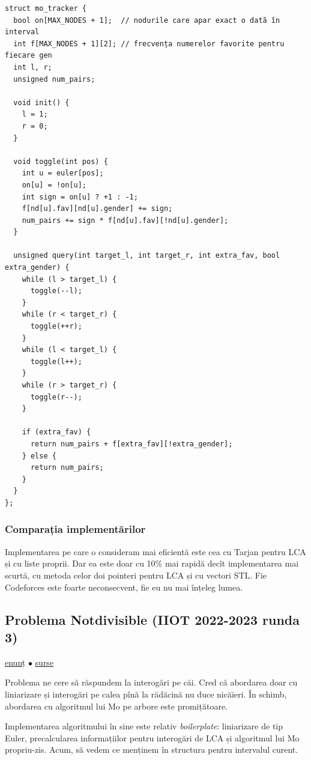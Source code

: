 \documentclass[../main.tex]{subfiles}
\begin{document}
\begin{verbatim}
struct mo_tracker {
  bool on[MAX_NODES + 1];  // nodurile care apar exact o dată în interval
  int f[MAX_NODES + 1][2]; // frecvența numerelor favorite pentru fiecare gen
  int l, r;
  unsigned num_pairs;

  void init() {
    l = 1;
    r = 0;
  }

  void toggle(int pos) {
    int u = euler[pos];
    on[u] = !on[u];
    int sign = on[u] ? +1 : -1;
    f[nd[u].fav][nd[u].gender] += sign;
    num_pairs += sign * f[nd[u].fav][!nd[u].gender];
  }

  unsigned query(int target_l, int target_r, int extra_fav, bool extra_gender) {
    while (l > target_l) {
      toggle(--l);
    }
    while (r < target_r) {
      toggle(++r);
    }
    while (l < target_l) {
      toggle(l++);
    }
    while (r > target_r) {
      toggle(r--);
    }

    if (extra_fav) {
      return num_pairs + f[extra_fav][!extra_gender];
    } else {
      return num_pairs;
    }
  }
};
\end{verbatim}

\subsubsection*{Comparația implementărilor}

Implementarea pe care o consideram mai eficientă este cea cu Tarjan pentru LCA și cu liste proprii. Dar ea este doar cu 10\% mai rapidă decît implementarea mai scurtă, cu metoda celor doi pointeri pentru LCA și cu vectori STL. Fie Codeforces este foarte neconsecvent, fie eu nu mai înțeleg lumea. 

\subsection{Problema Notdivisible (IIOT 2022-2023 runda 3)}
\label{problem:notdivisible}

\href{https://kilonova.ro/problems/364/}{enunț}
$\bullet$
\hyperref[code:notdivisible]{surse}

Problema ne cere să răspundem la interogări pe căi. Cred că abordarea doar cu liniarizare și interogări pe calea pînă la rădăcină nu duce nicăieri. În schimb, abordarea cu algoritmul lui Mo pe arbore este promițătoare.

Implementarea algoritmului în sine este relativ \textit{boilerplate}: liniarizare de tip Euler, precalcularea informațiilor pentru interogări de LCA și algoritmul lui Mo propriu-zis. Acum, să vedem ce menținem în structura pentru intervalul curent.
\end{document}
